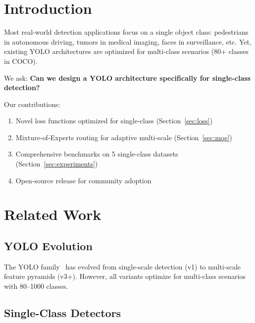 \documentclass[conference]{IEEEtran}
\begin{document}

\section{Introduction}

Most real-world detection applications focus on a single object class: pedestrians in autonomous driving, tumors in medical imaging, faces in surveillance, etc. Yet, existing YOLO architectures are optimized for multi-class scenarios (80+ classes in COCO).

We ask: \textbf{Can we design a YOLO architecture specifically for single-class detection?}

Our contributions:

\begin{enumerate}
\item Novel loss functions optimized for single-class (Section~\ref{sec:loss})
\item Mixture-of-Experts routing for adaptive multi-scale (Section~\ref{sec:moe})
\item Comprehensive benchmarks on 5 single-class datasets (Section~\ref{sec:experiments})
\item Open-source release for community adoption
\end{enumerate}


\section{Related Work}

\subsection{YOLO Evolution}

The YOLO family~\cite{redmon2016yolo,redmon2017yolo9000,redmon2018yolov3,bochkovskiy2020yolov4,ultralytics2023yolov8} has evolved from single-scale detection (v1) to multi-scale feature pyramids (v3+). However, all variants optimize for multi-class scenarios with 80--1000 classes.

\subsection{Single-Class Detectors}
\end{document}
